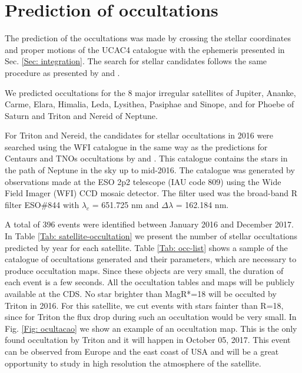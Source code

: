 \section{Prediction of occultations} \label{Sec: predictions}

The prediction of the occultations was made by crossing the stellar coordinates and proper motions of the UCAC4 catalogue \citep{Zacharias2013} with the ephemeris presented in Sec. \ref{Sec: integration}. The search for stellar candidates follows the same procedure as presented by \cite{Assafin2010, Assafin2012} and \cite{Camargo2014}.

We predicted occultations for the 8 major irregular satellites of Jupiter,  Ananke, Carme, Elara, Himalia, Leda, Lysithea, Pasiphae and Sinope, and for Phoebe of Saturn and Triton and Nereid of Neptune.

For Triton and Nereid, the candidates for stellar occultations in 2016 were searched using the WFI catalogue in the same way as the predictions for Centaurs and TNOs occultations by \cite{Assafin2010, Assafin2012} and \cite{Camargo2014}. This catalogue contains the stars in the path of Neptune in the sky up to mid-2016. The catalogue was generated by observations made at the ESO 2p2 telescope (IAU code 809) using the Wide Field Imager (WFI) CCD mosaic detector. The filter used was the broad-band R filter ESO\#844 with $\lambda_c$ = 651.725 nm and $\Delta\lambda$ = 162.184 nm.

A total of 396 events were identified between January 2016 and December 2017. In Table \ref{Tab: satellite-occultation} we present the number of stellar occultations predicted by year for each satellite. Table \ref{Tab: occ-list} shows a sample of the catalogue of occultations generated and their parameters, which are necessary to produce occultation maps. Since these objects are very small, the duration of each event is a few seconds. All the occultation tables and maps will be publicly available at the CDS. No star brighter than MagR*=18 will be occulted by Triton in 2016. For this satellite, we cut events with stars fainter than R=18, since for Triton the flux drop during such an occultation would be very small. In Fig. \ref{Fig: ocultacao} we show an example of an occultation map. This is the only found occultation by Triton and it will happen in October 05, 2017. This event can be observed from Europe and the east coast of USA and will be a great opportunity to study in high resolution the atmosphere of the satellite.

